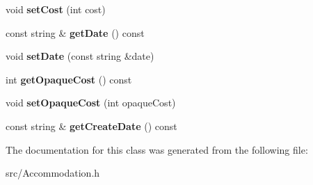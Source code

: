 \begin{DoxyCompactItemize}
void {\bfseries set\+Cost} (int cost)
\item 
\mbox{\label{class_accommodation_aff0df0114eac57e3ee5fb84c9266e0fb}} 
const string \& {\bfseries get\+Date} () const
\item 
\mbox{\label{class_accommodation_af03f6fa77dcdf6310ff77ee9992410ff}} 
void {\bfseries set\+Date} (const string \&date)
\item 
\mbox{\label{class_accommodation_aa46b6cd8f78b806b19c6f47da920a05f}} 
int {\bfseries get\+Opaque\+Cost} () const
\item 
\mbox{\label{class_accommodation_a78797d63a50e68ee2b511222a2a8fd44}} 
void {\bfseries set\+Opaque\+Cost} (int opaque\+Cost)
\item 
\mbox{\label{class_accommodation_a017e4cf2a6daf1806dffc9c5c8c1b34a}} 
const string \& {\bfseries get\+Create\+Date} () const
\end{DoxyCompactItemize}


The documentation for this class was generated from the following file\+:\begin{DoxyCompactItemize}
\item 
src/Accommodation.\+h\end{DoxyCompactItemize}
